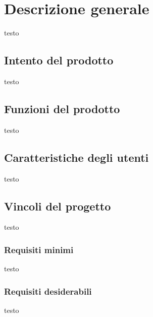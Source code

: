 \section{Descrizione generale}
testo

	\subsection{Intento del prodotto}
	testo
	
	\subsection{Funzioni del prodotto}
	testo

	\subsection{Caratteristiche degli utenti}
	testo
	
	\subsection{Vincoli del progetto}
		testo
	
		\subsubsection{Requisiti minimi}
		testo
	
		\subsubsection{Requisiti desiderabili}
		testo